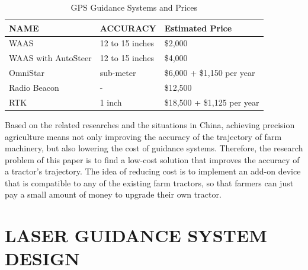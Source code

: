 \documentclass[letterpaper,12pt,oneside]{book}
\begin{document}
		\begin{table}[ht!]
			\begin{center}	
				\caption{GPS Guidance Systems and Prices \cite{PriceR}} 
				\begin{tabular}{|l|l|l|}
					\hline
					NAME & ACCURACY & Estimated Price \\ 
					\hline
					WAAS & 12 to 15 inches & \$2,000 \\
					\hline
					WAAS with AutoSteer &  12 to 15 inches & \$4,000\\
					\hline
					OmniStar & sub-meter & \$6,000 + \$1,150 per year\\
					\hline
					Radio Beacon & - & \$12,500\\
					\hline
					RTK & 1 inch & \$18,500 + \$1,125 per year\\
					\hline
					
				\end{tabular}
			\end{center}					
		\end{table}

		Based on the related researches and the situations in China, achieving precision agriculture means not only improving the accuracy of the trajectory of farm machinery, but also lowering the cost of guidance systems. Therefore, the research problem of this paper is to find a low-cost solution that improves the accuracy of a tractor's trajectory. The idea of reducing cost is to implement an add-on device that is compatible to any of the existing farm tractors, so that farmers can just pay a small amount of money to upgrade their own tractor. 
		
		
		
		\chapter{LASER GUIDANCE SYSTEM DESIGN}
		
\end{document}
